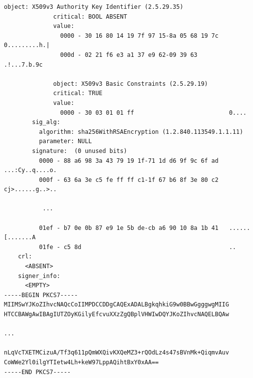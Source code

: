 \documentclass{article}
\begin{document}
\begin{lstlisting}[basicstyle=\tiny]
              object: X509v3 Authority Key Identifier (2.5.29.35)
              critical: BOOL ABSENT
              value:
                0000 - 30 16 80 14 19 7f 97 15-8a 05 68 19 7c   0.........h.|
                000d - 02 21 f6 e3 a1 37 e9 62-09 39 63         .!...7.b.9c

              object: X509v3 Basic Constraints (2.5.29.19)
              critical: TRUE
              value:
                0000 - 30 03 01 01 ff                           0....
        sig_alg:
          algorithm: sha256WithRSAEncryption (1.2.840.113549.1.1.11)
          parameter: NULL
        signature:  (0 unused bits)
          0000 - 88 a6 98 3a 43 79 19 1f-71 1d d6 9f 9c 6f ad   ...:Cy..q....o.
          000f - 63 6a 3e c5 fe ff ff c1-1f 67 b6 8f 3e 80 c2   cj>......g..>..

           ... 

          01ef - b7 0e 0b 87 e9 1e 5b de-cb a6 90 10 8a 1b 41   ......[.......A
          01fe - c5 8d                                          ..
    crl:
      <ABSENT>
    signer_info:
      <EMPTY>
-----BEGIN PKCS7-----
MIIMSwYJKoZIhvcNAQcCoIIMPDCCDDgCAQExADALBgkqhkiG9w0BBwGgggwgMIIG
HTCCBAWgAwIBAgIUTZOyKGilyEfcvuXXzZgQBplVHWIwDQYJKoZIhvcNAQELBQAw

... 

nLqVcTXETMCizuA/Tf3q611pQmWXQivKXQeMZ3+rQOdLz4s47sBVnMk+QiqmvAuv
CoWWe2Yl0ilgYTIetw4Lh+keW97LppAQihtBxY0xAA==
-----END PKCS7-----
\end{lstlisting}
\end{document}
